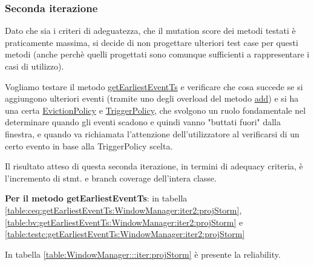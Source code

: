 \documentclass[10pt, a4paper]{article}
\newcommand{\gettablelabel}[5]{table:#1:#2:#3:iter#4:proj#5}
\newcommand{\getreltablelabel}[2]{\gettablelabel{#1}{}{}{}{#2}}
\def\storm{Storm}
\begin{document}
	
	\subsubsection{Seconda iterazione}
	
	Dato che sia i criteri di adeguatezza, che il mutation score dei metodi testati è praticamente massima,
	si decide di non progettare ulteriori test case per questi metodi (anche perchè quelli progettati sono
	comunque sufficienti a rappresentare i casi di utilizzo).
	
	Vogliamo testare il metodo 
	\href{https://storm.apache.org/releases/2.6.2/javadocs/org/apache/storm/windowing/WindowManager.html#getEarliestEventTs(long,long)}
	{getEarliestEventTs} e verificare che cosa succede se si aggiungono ulteriori eventi (tramite uno degli
	overload del metodo 
	\href{https://storm.apache.org/releases/2.6.2/javadocs/org/apache/storm/windowing/WindowManager.html#add(T)}
	{add}) e si ha una certa 
	\href{https://storm.apache.org/releases/2.6.2/javadocs/org/apache/storm/windowing/EvictionPolicy.html}
	{EvictionPolicy} e 
	\href{https://storm.apache.org/releases/2.6.2/javadocs/org/apache/storm/windowing/TriggerPolicy.html}
	{TriggerPolicy}, che svolgono un ruolo fondamentale nel determinare quando gli eventi scadono e quindi vanno
	"buttati fuori" dalla finestra, e quando va richiamata l'attenzione dell'utilizzatore al verificarsi di
	un certo evento in base alla TriggerPolicy scelta.
	
	Il risultato atteso di questa seconda iterazione, in termini di adequacy criteria, 
	è l'incremento di stmt. e branch coverage dell'intera classe.
	
	\textbf{Per il metodo getEarliestEventTs}: in tabella 
	\ref{\gettablelabel{ceq}{getEarliestEventTs}{WindowManager}{2}{\storm}},
	\ref{\gettablelabel{bv}{getEarliestEventTs}{WindowManager}{2}{\storm}} e
	\ref{\gettablelabel{testc}{getEarliestEventTs}{WindowManager}{2}{\storm}}
	
	In tabella \ref{\getreltablelabel{WindowManager}{\storm}} è presente la reliability.
	
	\newpage
\end{document}
